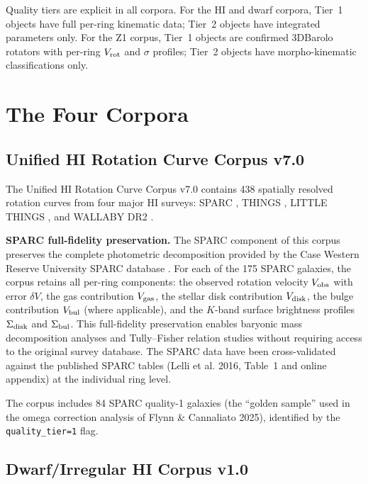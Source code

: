 \documentclass[twocolumn]{aastex631}
\begin{document}
Quality tiers are explicit in all corpora. For the HI and dwarf corpora,
Tier~1 objects have full per-ring kinematic data; Tier~2 objects have
integrated parameters only. For the Z1 corpus, Tier~1 objects are confirmed
3DBarolo rotators with per-ring $V_{\rm rot}$ and $\sigma$ profiles;
Tier~2 objects have morpho-kinematic classifications only.

\section{The Four Corpora}
\label{sec:corpora}

\subsection{Unified HI Rotation Curve Corpus v7.0}
\label{sec:hi}

The Unified HI Rotation Curve Corpus v7.0 \citep{flynn2026_hi} contains 438
spatially resolved rotation curves from four major HI surveys: SPARC
\citep[175 galaxies;][]{lelli2016}, THINGS \citep[34 galaxies;][]{walter2008},
LITTLE THINGS \citep[26 galaxies;][]{oh2015}, and WALLABY DR2
\citep[203 galaxies;][]{koribalski2020}.

\textbf{SPARC full-fidelity preservation.} The SPARC component of this corpus
preserves the complete photometric decomposition provided by the Case Western
Reserve University SPARC database \citep{lelli2016}. For each of the 175 SPARC
galaxies, the corpus retains all per-ring components: the observed rotation
velocity $V_{\rm obs}$ with error $\delta V$, the gas contribution $V_{\rm gas}$,
the stellar disk contribution $V_{\rm disk}$, the bulge contribution $V_{\rm bul}$
(where applicable), and the $K$-band surface brightness profiles $\Sigma_{\rm disk}$
and $\Sigma_{\rm bul}$. This full-fidelity preservation enables baryonic mass
decomposition analyses and Tully--Fisher relation studies without requiring
access to the original survey database. The SPARC data have been cross-validated
against the published SPARC tables (Lelli et al. 2016, Table~1 and online
appendix) at the individual ring level.

The corpus includes 84 SPARC quality-1 galaxies (the ``golden sample'' used
in the omega correction analysis of Flynn \& Cannaliato 2025), identified by
the \texttt{quality\_tier=1} flag.

\subsection{Dwarf/Irregular HI Corpus v1.0}
\label{sec:dwarfs}
\end{document}
